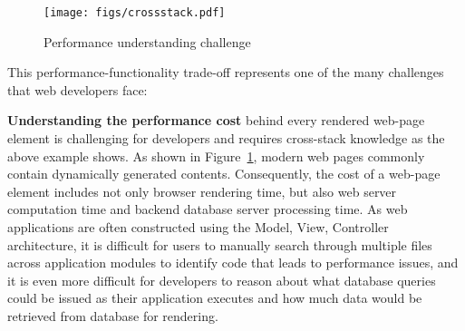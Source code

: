 \begin{figure}
 \texttt{[image: figs/crossstack.pdf]}
\vspace{0.1in}
\caption{Performance understanding challenge}
\label{fig:crossstack}
\vspace{-0.2in}
\end{figure}

This performance-functionality trade-off represents one of the many challenges that web developers face:

{\bf Understanding the performance cost} behind every rendered web-page element is challenging for developers and requires cross-stack knowledge as the above example shows.
As shown in Figure~\ref{fig:crossstack}, modern web pages commonly contain
dynamically generated contents. Consequently, the cost of a web-page element
includes not only browser rendering time, but also web server
computation time and backend database server processing time.
As web applications are often constructed using 
the Model, View, Controller~\cite{mvc} architecture, 
it is difficult for users to manually search through multiple files 
across application modules to identify code that leads to performance issues, and it is even more difficult for developers
to reason about what database queries could be issued as their application executes and how much data would be retrieved from database for rendering.


